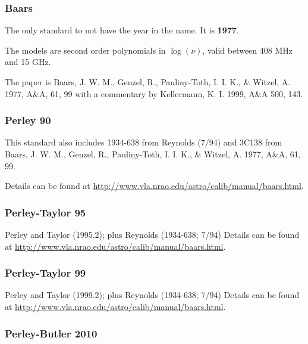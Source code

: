 \subsubsection{Baars}
\label{section:conventions.longwavelength.baars}

The only standard to not have the year in the name.  It is \textbf{1977}.

The models are second order polynomials in $\log(\nu)$, valid between 408 MHz and
15 GHz.

The paper is Baars, J. W. M., Genzel, R., Pauliny-Toth, I. I. K., \&
Witzel, A. 1977, A\&A, 61, 99 with a commentary by 
Kellermann, K. I. 1999, A\&A 500, 143.


\subsubsection{Perley 90}
\label{section:conventions.longwavelength.perley90}

This standard also includes 1934-638 from Reynolds (7/94) and 3C138
from Baars, J. W. M., Genzel, R., Pauliny-Toth, I. I. K., \&  Witzel,
A. 1977, A\&A, 61, 99.

Details can be found at \url{http://www.vla.nrao.edu/astro/calib/manual/baars.html}.

\subsubsection{Perley-Taylor 95}
\label{section:conventions.longwavelength.perleytaylor95}

Perley and Taylor (1995.2); plus Reynolds (1934-638; 7/94)
Details can be found at \url{http://www.vla.nrao.edu/astro/calib/manual/baars.html}.

\subsubsection{Perley-Taylor 99}
\label{section:conventions.longwavelength.perleytaylor99}

Perley and Taylor (1999.2); plus Reynolds (1934-638; 7/94)
Details can be found at \url{http://www.vla.nrao.edu/astro/calib/manual/baars.html}.

 
\subsubsection{Perley-Butler 2010}
\label{section:conventions.longwavelength.perleybutler10}

